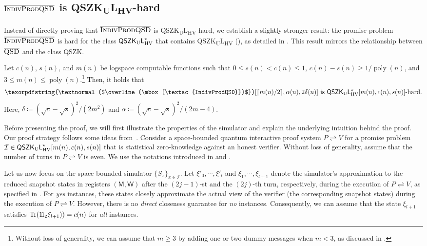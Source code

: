 \documentclass[11pt, a4paper]{article}
\numberwithin{equation}{section}
\numberwithin{figure}{section}
\newcommand{\QSZK}{\textnormal{\textsf{QSZK}}\xspace}
\newcommand{\QSZKULHV}{\texorpdfstring{\textnormal{\textsf{QSZK}\textsubscript{\textnormal{U}}\textsf{L}}\textsubscript{\textnormal{HV}}}\xspace}
\newcommand{\QSZKULstar}{\mathsf{QSZK_{\textnormal{U}}L}^{\star}_{\mathrm{HV}}}
\newcommand{\protocol}[2]{{#1}\!\rightleftharpoons\!{#2}}
\newcommand{\textoverline}[1]{$\overline{\mbox{#1}}$}
\newcommand{\coQSD}{\texorpdfstring{\textnormal{\textoverline{\textsc{QSD}}}}\xspace}
\newcommand{\coIndivProdQSD}{\texorpdfstring{\textnormal{\textoverline{\textsc{IndivProdQSD}}}}\xspace}
\DeclarePairedDelimiter\rbra{\lparen}{\rparen}
\DeclarePairedDelimiter\sbra{\lbrack}{\rbrack}
\DeclarePairedDelimiter\ceil{\lceil}{\rceil}
\let\ket\relax\DeclarePairedDelimiter\ket{\lvert}{\rangle}
\let\bra\relax\DeclarePairedDelimiter\bra{\langle}{\rvert}
\newcommand{\ketbra}[2]{\ensuremath{\ket{#1}\!\bra{#2}}}
\newcommand{\Tr}{\mathrm{Tr}}
\DeclareMathOperator\poly{poly}
\newcommand{\calI}{\mathcal{I}}
\newcommand{\sfM}{\mathsf{M}}
\newcommand{\sfW}{\mathsf{W}}
\newcommand{\ttZ}{\mathtt{Z}}
\begin{document}
\subsection{\coIndivProdQSD{} is \QSZKULHV{}-hard}
\label{subsec:IndivProdQSD-QSZKLhard}

Instead of directly proving that \coIndivProdQSD{} is \QSZKULHV{}-hard, we establish a slightly stronger result: the promise problem \coIndivProdQSD{} is hard for the class $\QSZKULstar$ that contains \QSZKULHV{} (), as detailed in . This result mirrors the relationship between \coQSD{} and the class \QSZK{}. 
\begin{theorem}[\coIndivProdQSD{} is $\QSZKULstar$-hard]
    \label{thm:IndivProdQSD-QSZKLhard}
    Let $c(n)$, $s(n)$, and $m(n)$ be logspace computable functions such that $0 \leq s(n) < c(n) \leq 1$, $c(n) - s(n) \geq 1/\poly(n)$, and $3 \leq m(n) \leq \poly(n)$.\footnote{Without loss of generality, we can assume that $m \geq 3$ by adding one or two dummy messages when $m < 3$, as discussed in .} Then, it holds that 
    \[ \coIndivProdQSD\sbra*{\ceil*{m(n)/2}, \alpha(n), 2\delta(n)} \text{ is } \QSZKULstar[m(n),c(n),s(n)]\text{-hard}.\]
    Here, $\delta \coloneqq (\sqrt{c}-\sqrt{s})^2/(2m^2)$ and $\alpha \coloneqq (\sqrt{c}-\sqrt{s})^2/(2m-4)$. 
\end{theorem}

Before presenting the proof, we will first illustrate the properties of the simulator and explain the underlying intuition behind the proof. Our proof strategy follows some ideas from~\cite[Section 5]{Wat02QSZK}. Consider a space-bounded quantum interactive proof system $\protocol{P}{V}$ for a promise problem $\calI \in \QSZKULstar[m(n),c(n),s(n)]$ that is statistical zero-knowledge against an honest verifier. Without loss of generality, assume that the number of turns in $\protocol{P}{V}$ is even. We use the notations introduced in  and . 

Let us now focus on the space-bounded simulator $\{S_x\}_{x\in\calI}$. Let $\xi'_0,\cdots,\xi'_l$ and $\xi_1,\cdots,\xi_{l+1}$ denote the simulator's approximation to the reduced snapshot states in registers $(\sfM,\sfW)$ after the $(2j-1)$-st and the $(2j)$-th turn, respectively, during the execution of $\protocol{P}{V}$, as specified in . For \textit{yes} instances, these states closely approximate the actual view of the verifier (the corresponding snapshot states) during the execution of $\protocol{P}{V}$. However, there is no \textit{direct} closeness guarantee for \textit{no} instances. Consequently, we can assume that the state $\xi_{l+1}$ satisfies $\Tr\rbra*{\ketbra{1}{1}_{\ttZ} \xi_{l+1})} = c(n)$ for \textit{all} instances. 
\end{document}
